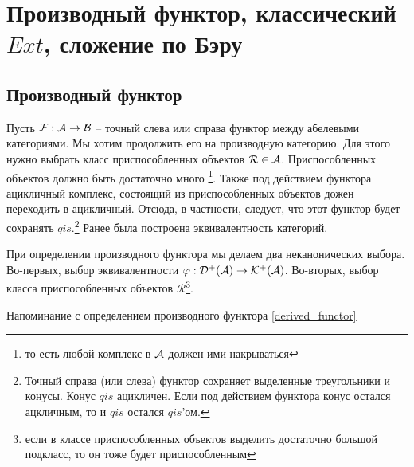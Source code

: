 \documentclass[../main.tex]{subfiles}
\begin{document}
\section{Производный функтор, классический $Ext$, сложение по Бэру}
\subsection{Производный функтор}
Пусть $\mathcal{F}: \mathcal{A} \rightarrow \mathcal{B}$ -- точный слева или справа функтор между абелевыми категориями. Мы хотим продолжить его на производную категорию. Для этого нужно выбрать класс приспособленных объектов $\mathcal{R} \in \mathcal{A}$. Приспособленных объектов должно быть достаточно много \footnote{то есть любой комплекс в $\mathcal{A}$ должен ими накрываться}. Также под действием функтора ацикличный комплекс, состоящий из приспособленных объектов дожен переходить в ацикличный. Отсюда, в частности, следует, что этот функтор будет сохранять $qis$.\footnote{Точный справа (или слева) функтор сохраняет выделенные треугольники и конусы. Конус $qis$ ацикличен. Если под действием функтора конус остался ацкличным, то и $qis$ остался $qis$'ом.}
Ранее была построена эквивалентность категорий.
\bee
{}
\eee
\bee
{}
\eee
\begin{to_com}
При определении производного функтора мы делаем два неканонических  выбора. Во-первых, выбор эквивалентности $\varphi: \mathcal{D^+(A)} \rightarrow \mathcal{K^+(A)}$. Во-вторых, выбор класса приспособленных объектов $\mathcal{R}$\footnote{если в классе приспособленных объектов выделить достаточно большой подкласс, то он тоже будет приспособленным}.
\end{to_com}
Напоминание с определением производного функтора \ref{derived_functor}
\bee
{}
\eee
\bee
{}
\end{document}
